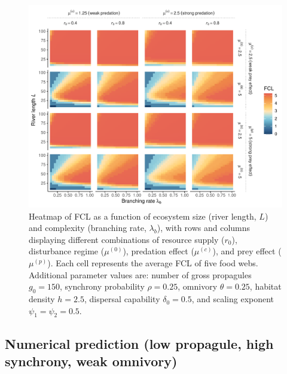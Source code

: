 \begin{figure}
\centering
\includegraphics{../data_fmt/fig_rho025_g150_theta025.pdf}
\caption{Heatmap of FCL as a function of ecosystem size (river length,
\(L\)) and complexity (branching rate, \(\lambda_b\)), with rows and
columns displaying different combinations of resource supply (\(r_0\)),
disturbance regime (\(\mu^{(0)}\)), predation effect (\(\mu^{(c)}\)),
and prey effect (\(\mu^{(p)}\)). Each cell represents the average FCL of
five food webs. Additional parameter values are: number of gross
propagules \(g_0=150\), synchrony probability \(\rho=0.25\), omnivory
\(\theta=0.25\), habitat density \(h=2.5\), dispersal capability
\(\delta_0=0.5\), and scaling exponent \(\psi_1=\psi_2=0.5\).}
\end{figure}

\newpage

\subsection*{Numerical prediction (low propagule, high synchrony, weak
omnivory)}\label{numerical-prediction-low-propagule-high-synchrony-weak-omnivory}

